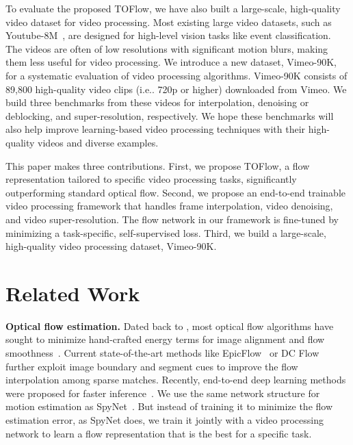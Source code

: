 \documentclass[twocolumn,natbib]{svjour3}          \smartqed  \usepackage{graphicx}
\makeatletter
\def\data{Vimeo-90K\xspace}
\def\model{TOFlow\xspace}
\def\toflow{TOFlow\xspace}
\DeclareRobustCommand\onedot{\futurelet\@let@token\@onedot}
\def\@onedot{\ifx\@let@token.\else.\null\fi\xspace}
\def\ie{i.e\onedot} \def\Ie{I.e\onedot}
\newcommand{\myparagraph}[1]{\vspace{5pt}\noindent\textbf{#1}}
\makeatother
\begin{document}
To evaluate the proposed \toflow, we have also built a large-scale, high-quality video dataset for video processing. Most existing large video datasets, such as Youtube-8M~\citep{Abu-El-Haija2016Youtube}, are designed for high-level vision tasks like event classification. The videos are often of low resolutions with significant motion blurs, 
making them less useful for video processing. We introduce a new dataset, \data, for a systematic evaluation of video processing algorithms. \data consists of 89,800 
high-quality video clips (\ie 720p or higher) downloaded from Vimeo. We build three benchmarks from these videos for interpolation, denoising or deblocking, and super-resolution, respectively. We hope these benchmarks will also help improve learning-based video processing techniques with their high-quality videos and diverse examples.

This paper makes three contributions. First, we propose \model, a flow representation tailored to specific video processing tasks, significantly outperforming standard optical flow. 
Second, we propose an end-to-end trainable video processing framework that handles frame interpolation, video denoising, and video super-resolution. The flow network in our framework is fine-tuned by minimizing a task-specific, self-supervised loss.
Third, we build a large-scale, high-quality video processing dataset, \data.
 \section{Related Work}
\label{sec:related}


\myparagraph{Optical flow estimation. }
Dated back to \cite{horn1981determining}, most optical flow algorithms have sought to minimize hand-crafted energy terms for image alignment and flow smoothness~\citep{memin1998dense,brox2004high,Brox2009Large,wedel2009structure}.
Current state-of-the-art methods like EpicFlow~\citep{Revaud2015Epicflow} or DC Flow~\citep{Xu2017Accurate} further exploit image boundary and segment cues to improve the flow interpolation among sparse matches.
Recently, end-to-end deep learning methods were proposed for faster inference~\citep{Fischer2015Flownet:,Ranjan2017Optical,yu2016back}. We use the same network structure for motion estimation as SpyNet~\citep{Ranjan2017Optical}. But instead of training it to minimize the flow estimation error, as SpyNet does, we train it jointly with a video processing network to learn a flow representation that is the best for a specific task.
\end{document}
